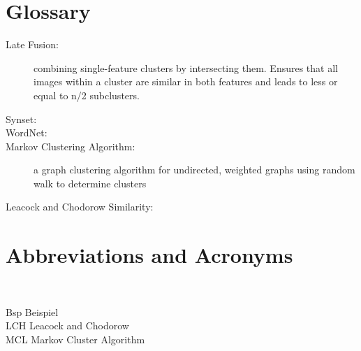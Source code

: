 \section{Glossary} %

\begin{description}
\item[Late Fusion:] combining single-feature clusters by intersecting them. Ensures that all images within a cluster are similar in both features and leads to less or equal to n/2 subclusters.

\item[Synset:]

\item[WordNet:]

\item[Markov Clustering Algorithm:] a graph clustering algorithm for undirected, weighted graphs using random walk to determine clusters

\item[Leacock and Chodorow Similarity:]
\end{description}


\newpage

\section{Abbreviations and Acronyms}

\begin{tabbing}
\hspace*{3cm}\=  \\ \kill

Bsp \> Beispiel\\
LCH \> Leacock and Chodorow\\
MCL \> Markov Cluster Algorithm\\

\end{tabbing}
